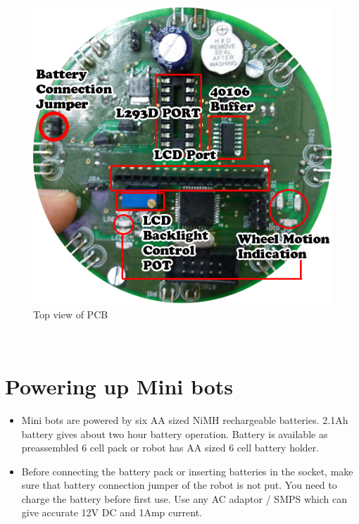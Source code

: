 \documentclass[a4paper,12pt,oneside]{book}
\begin{document}
	\begin{figure}[h!]
		\caption{Top view of PCB}
		\includegraphics[width=\textwidth]{./HardwareManual/Front.jpg}
	\end{figure}
	\hfill\\
	
	\chapter{Powering up Mini bots}
	\begin{itemize}
		\item{Mini bots are powered by six AA sized NiMH rechargeable batteries. 2.1Ah battery gives about
			two hour battery operation. Battery is available as preassembled 6 cell pack or robot has AA
			sized 6 cell battery holder.}
		\item{Before connecting the battery pack or inserting batteries in the socket, make sure that 	battery connection jumper of the robot is not put. You need to charge the battery before first use. Use any AC adaptor / SMPS	which can give accurate 12V DC and 1Amp current.}
	\end{itemize}
\end{document}
